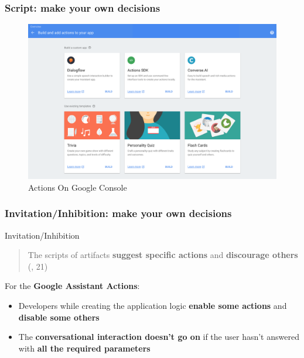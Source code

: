 \documentclass{beamer}
\begin{document}
\begin{frame}
\frametitle{Script: make your own decisions}
\begin{figure}
	\centering
	\includegraphics[width=1\linewidth]{images/script_image}
	\caption[actions_google]{Actions On Google Console}
	\label{fig:scriptimage}
\end{figure}

\end{frame}

\begin{frame}
\frametitle{Invitation/Inhibition: make your own decisions}

\begin{block}{Invitation/Inhibition} 
	\begin{quote}
		The scripts of artifacts \textbf{suggest specific actions} and \textbf{discourage others} (\cite{verbeek2011moralizing}, 21)
	\end{quote}
\vspace{0.5cm}
For the \textbf{Google Assistant Actions}:
\begin{itemize}
	\item Developers while creating the application logic \textbf{enable some actions} and \textbf{disable some others}
	\item The \textbf{conversational interaction doesn't go on} if the user hasn't answered with \textbf{all the required parameters}
\end{itemize}

\end{block}

\end{frame}
\end{document}
